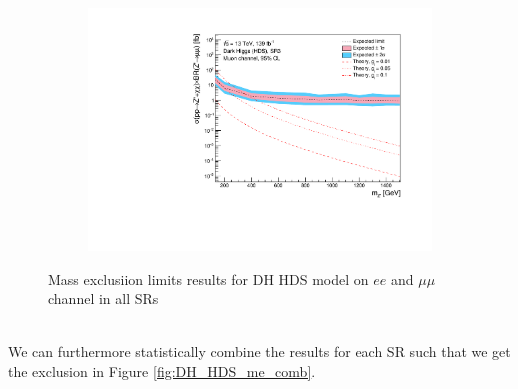 \documentclass[12pt, a4paper]{book}
\begin{document}
\begin{figure}[!ht]
\begin{subfigure}[b]{0.49\textwidth}
   \end{subfigure}
   \hfill
   \begin{subfigure}[b]{0.49\textwidth}
      \centering
      \includegraphics[width=1\textwidth]{Limits/Model_independent/150/DH_HDS/mass_exclusion_uu.pdf}
   \end{subfigure}
   \caption{Mass exclusiion limits results for DH HDS model on $ee$ and $\mu\mu$ channel in all SRs}\label{fig:DH_HDS_me_SRS}
\end{figure} 
\\We can furthermore statistically combine the results for each SR such that we get the exclusion in Figure \ref{fig:DH_HDS_me_comb}. 
\end{document}
